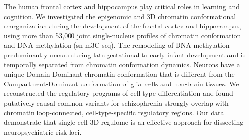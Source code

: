 \noindent
The human frontal cortex and hippocampus play critical roles in learning and cognition. We investigated the epigenomic and 3D chromatin conformational reorganization during the development of the frontal cortex and hippocampus, using more than 53,000 joint single-nucleus profiles of chromatin conformation and DNA methylation (sn-m3C-seq). The remodeling of DNA methylation predominantly occurs during late-gestational to early-infant development and is temporally separated from chromatin conformation dynamics. Neurons have a unique Domain-Dominant chromatin conformation that is different from the Compartment-Dominant conformation of glial cells and non-brain tissues. We reconstructed the regulatory programs of cell-type differentiation and found putatively causal common variants for schizophrenia strongly overlap with chromatin loop-connected, cell-type-specific regulatory regions. Our data demonstrate that single-cell 3D-regulome is an effective approach for dissecting neuropsychiatric risk loci.
\newpage





